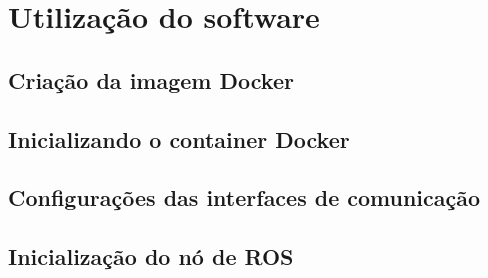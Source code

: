 \chapter{Utilização do software}
\label{ch4}

\section{Criação da imagem Docker}

\section{Inicializando o container Docker}

\section{Configurações das interfaces de comunicação}

\section{Inicialização do nó de ROS}